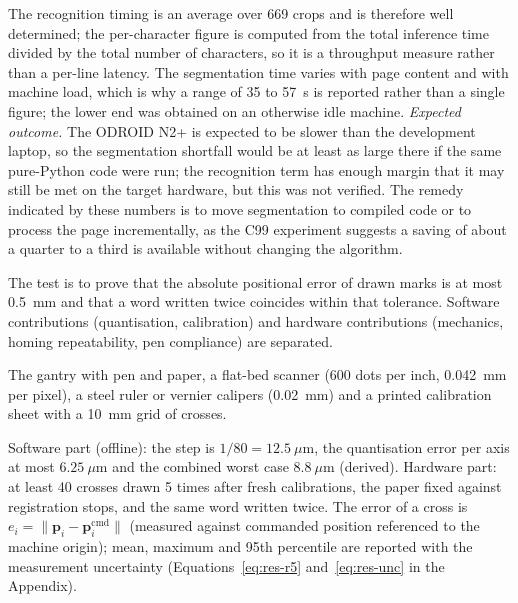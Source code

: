
            The recognition timing is an average over 669 crops and is therefore well determined; the per-character figure is computed from the total inference time divided by the total number of characters, so it is a throughput measure rather than a per-line latency.
            The segmentation time varies with page content and with machine load, which is why a range of 35 to 57~s is reported rather than a single figure; the lower end was obtained on an otherwise idle machine.
            \emph{Expected outcome.}
            The ODROID N2+ is expected to be slower than the development laptop, so the segmentation shortfall would be at least as large there if the same pure-Python code were run; the recognition term has enough margin that it may still be met on the target hardware, but this was not verified.
            The remedy indicated by these numbers is to move segmentation to compiled code or to process the page incrementally, as the C99 experiment suggests a saving of about a quarter to a third is available without changing the algorithm.



\medskip
\label{sec:res-qtp5}


            The test is to prove that the absolute positional error of drawn marks is at most 0.5~mm and that a word written twice coincides within that tolerance.
            Software contributions (quantisation, calibration) and hardware contributions (mechanics, homing repeatability, pen compliance) are separated.


            The gantry with pen and paper, a flat-bed scanner (600 dots per inch, 0.042~mm per pixel), a steel ruler or vernier calipers (0.02~mm) and a printed calibration sheet with a 10~mm grid of crosses.


            Software part (offline): the step is $1/80=12.5~\mu$m, the quantisation error per axis at most $6.25~\mu$m and the combined worst case $8.8~\mu$m (derived).
            Hardware part: at least 40 crosses drawn 5 times after fresh calibrations, the paper fixed against registration stops, and the same word written twice.
            The error of a cross is $e_i=\lVert\mathbf{p}_i-\mathbf{p}_i^{\mathrm{cmd}}\rVert$ (measured against commanded position referenced to the machine origin); mean, maximum and 95th percentile are reported with the measurement uncertainty (Equations~\ref{eq:res-r5} and~\ref{eq:res-unc} in the Appendix).

